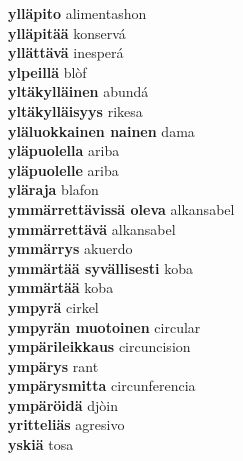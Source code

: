 \textbf{ ylläpito  } alimentashon \\
\textbf{ ylläpitää  } konservá \\
\textbf{ yllättävä  } inesperá \\
\textbf{ ylpeillä  } blòf \\
\textbf{ yltäkylläinen  } abundá \\
\textbf{ yltäkylläisyys  } rikesa \\
\textbf{ yläluokkainen nainen  } dama \\
\textbf{ yläpuolella  } ariba \\
\textbf{ yläpuolelle  } ariba \\
\textbf{ yläraja  } blafon \\
\textbf{ ymmärrettävissä oleva  } alkansabel \\
\textbf{ ymmärrettävä  } alkansabel \\
\textbf{ ymmärrys  } akuerdo \\
\textbf{ ymmärtää syvällisesti  } koba \\
\textbf{ ymmärtää  } koba \\
\textbf{ ympyrä  } cirkel \\
\textbf{ ympyrän muotoinen  } circular \\
\textbf{ ympärileikkaus  } circuncision \\
\textbf{ ympärys  } rant \\
\textbf{ ympärysmitta  } circunferencia \\
\textbf{ ympäröidä  } djòin \\
\textbf{ yritteliäs  } agresivo \\
\textbf{ yskiä  } tosa \\
